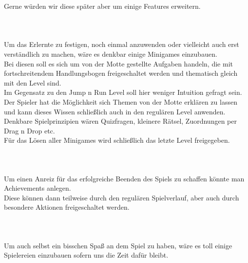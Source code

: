 \documentclass[10pt,a4paper,notitlepage]{report}
\begin{document}
	Gerne würden wir diese später aber um einige Features erweitern.
	\\\\
	\
	\\\\
	\Text
		Um das Erlernte zu festigen, noch einmal anzuwenden oder vielleicht auch erst verständlich zu machen, wäre es denkbar einige Minigames einzubauen.\\ 
	Bei diesen soll es sich um von der Motte gestellte Aufgaben handeln, die mit fortschreitendem Handlungsbogen freigeschaltet werden 
	und thematisch gleich mit den Level sind.\\
	Im Gegensatz zu den Jump n Run Level soll hier weniger Intuition gefragt sein. Der Spieler hat die Möglichkeit sich Themen von der Motte 
	erklären zu lassen und kann dieses Wissen schließlich auch in den regulären Level anwenden.\\
	Denkbare Spielprinzipien wären Quizfragen, kleinere Rätsel, Zuordnungen per Drag n Drop etc.\\
	Für das Lösen aller Minigames wird schließlich das letzte Level freigegeben.\\
	\\
	\
	\\\\
	\Text
		Um einen Anreiz für das erfolgreiche Beenden des Spiels zu schaffen könnte man Achievements anlegen.\\
	Diese können dann teilweise durch den regulären Spielverlauf, aber auch durch besondere Aktionen freigeschaltet werden.\\
	\\
	\Drei{3.3. Eastereggs}
	\\\\
	\Text
		Um auch selbst ein bisschen Spaß an dem Spiel zu haben, wäre es toll einige Spielereien einzubauen sofern uns die Zeit dafür bleibt.\\
	\\
	\Fusszeile
\end{document}
